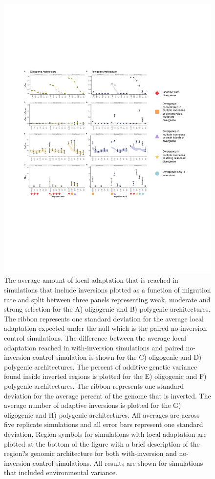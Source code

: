 \documentclass[10pt, scrartlc]{article}
\begin{document}
\begin{figure}[h]
	\begin{center}
		\includegraphics[width = 6.5 in]{Fig2_LA.pdf}
	\end{center}
	\caption[Local Adaptation]{The average amount of local adaptation that is reached in simulations that include inversions plotted as a function of migration rate and split between three panels representing weak, moderate and strong selection for the A) oligogenic and B) polygenic architectures. The ribbon represents one standard deviation for the average local adaptation expected under the null which is the paired no-inversion control simulations. The difference between the average local adaptation reached in with-inversion simulations and paired no-inversion control simulation is shown for the C) oligogenic and D) polygenic architectures. The percent of additive genetic variance found inside inverted regions is plotted for the E) oligogenic and F) polygenic architectures. The ribbon represents one standard deviation for the average percent of the genome that is inverted. The average number of adaptive inversions is plotted for the G) oligogenic and H) polygenic architectures. All averages are across five replicate simulations and all error bars represent one standard deviation. Region symbols for simulations with local adaptation are plotted at the bottom of the figure with a brief description of the region?s genomic architecture for both with-inversion and no-inversion control simulations. All results are shown for simulations that included environmental variance.}
\end{figure}
\end{document}
